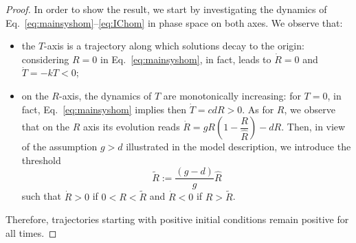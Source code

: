 \documentclass[11pt]{elsarticle}
\theoremstyle{plain}
\theoremstyle{definition}
\theoremstyle{myremark}
\begin{document}
\begin{proof}
In order to show the result, we start by investigating the dynamics of Eq.~\eqref{eq:mainsyshom}--\eqref{eq:IChom} in phase space on both axes. We observe that:
\begin{itemize}
\item[-] the $T$-axis is a trajectory along which solutions decay to the origin: considering $R=0$ in Eq.~\eqref{eq:mainsyshom}, in fact, leads to $\dot{R}=0$ and $\dot{T}=-kT<0$;
\item[-] on the $R$-axis, the dynamics of $T$ are monotonically increasing: 
for $T=0$, in fact, Eq.~\eqref{eq:mainsyshom} implies then $\dot{T}=cdR>0$. As for $R$, we observe that on the $R$ axis its evolution reads $\dot{R}=gR\left(1-\dfrac{R}{\hat{R}}\right)-dR$. Then, in view of the assumption $g>d$ illustrated in the model description, we introduce the threshold
\begin{equation} \label{eq:Rtilde}
    \tilde{R}:=\frac{(g-d)}{g} \hat{R}%
\end{equation}
such that $\dot{R}>0$ if $0<R<\tilde{R}$ and $\dot{R}<0$ if $R > \tilde{R}$.
\end{itemize}
Therefore, trajectories starting with positive initial conditions remain positive for all times.


\end{proof}
\end{document}
